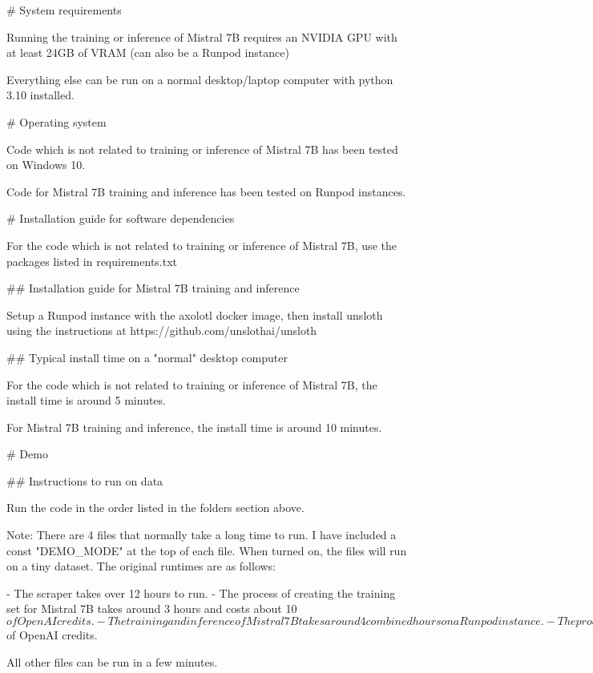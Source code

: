 # System requirements

Running the training or inference of Mistral 7B requires an NVIDIA GPU with at least 24GB of VRAM (can also be a Runpod instance)

Everything else can be run on a normal desktop/laptop computer with python 3.10 installed.

# Operating system

Code which is not related to training or inference of Mistral 7B has been tested on Windows 10.

Code for Mistral 7B training and inference has been tested on Runpod instances.

# Installation guide for software dependencies

For the code which is not related to training or inference of Mistral 7B, use the packages listed in requirements.txt

## Installation guide for Mistral 7B training and inference

Setup a Runpod instance with the axolotl docker image, then install unsloth using the instructions at https://github.com/unslothai/unsloth

## Typical install time on a "normal" desktop computer

For the code which is not related to training or inference of Mistral 7B, the install time is around 5 minutes.

For Mistral 7B training and inference, the install time is around 10 minutes.

# Demo

## Instructions to run on data

Run the code in the order listed in the folders section above.

Note: There are 4 files that normally take a long time to run. I have included a const "DEMO_MODE" at the top of each file. When turned on, the files will run on a tiny dataset. The original runtimes are as follows:

- The scraper takes over 12 hours to run.
- The process of creating the training set for Mistral 7B takes around 3 hours and costs about 10$ of OpenAI credits.
- The training and inference of Mistral 7B takes around 4 combined hours on a Runpod instance.
- The process of mapping the hardware names to those of the efficiency table takes around 3 hour and also costs about 10$ of OpenAI credits.

All other files can be run in a few minutes.